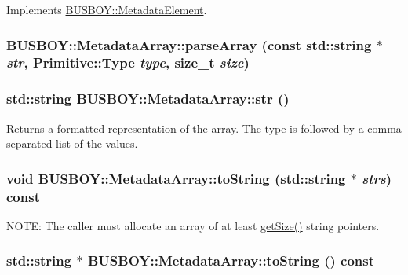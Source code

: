 Implements \hyperlink{classBUSBOY_1_1MetadataElement_ac56f20521c49259ff043c2d69bc4c08e}{BUSBOY::MetadataElement}.\hypertarget{classBUSBOY_1_1MetadataArray_ad17ba74b33150b8783c5ef7c0f66c05a}{
\subsubsection[{parseArray}]{ BUSBOY::MetadataArray::parseArray (const std::string $\ast$ {\em str}, \/  {\bf Primitive::Type} {\em type}, \/  size\_\-t {\em size})}}
\label{classBUSBOY_1_1MetadataArray_ad17ba74b33150b8783c5ef7c0f66c05a}
\hypertarget{classBUSBOY_1_1MetadataArray_afc38895092e35b17bee29a1f4c3e1eb6}{
\subsubsection[{str}]{\setlength{\rightskip}{0pt plus 5cm}std::string BUSBOY::MetadataArray::str ()}}
\label{classBUSBOY_1_1MetadataArray_afc38895092e35b17bee29a1f4c3e1eb6}


Returns a formatted representation of the array. The type is followed by a comma separated list of the values. \hypertarget{classBUSBOY_1_1MetadataArray_a1884d698f185fa233e9cb72c130c4a64}{
\subsubsection[{toString}]{\setlength{\rightskip}{0pt plus 5cm}void BUSBOY::MetadataArray::toString (std::string $\ast$ {\em strs}) const}}
\label{classBUSBOY_1_1MetadataArray_a1884d698f185fa233e9cb72c130c4a64}


NOTE: The caller must allocate an array of at least \hyperlink{classBUSBOY_1_1MetadataArray_a41adb6cde8e1adf9a85813dfac0611d4}{getSize()} string pointers. \hypertarget{classBUSBOY_1_1MetadataArray_adb7b1b79f1846ef2afbb9a5d86e9f49d}{
\subsubsection[{toString}]{\setlength{\rightskip}{0pt plus 5cm}std::string $\ast$ BUSBOY::MetadataArray::toString () const}}
\label{classBUSBOY_1_1MetadataArray_adb7b1b79f1846ef2afbb9a5d86e9f49d}



